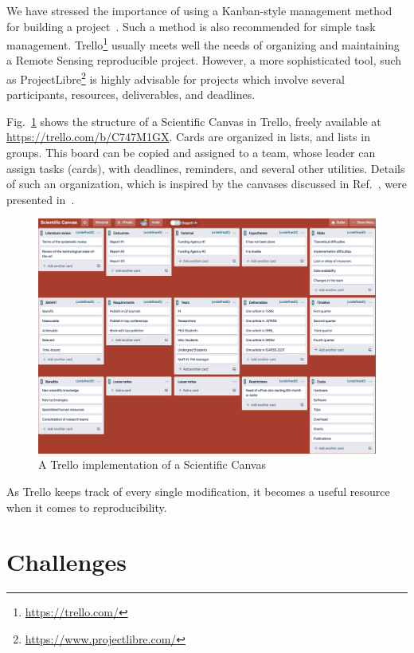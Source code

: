 \documentclass[journal,twoside]{IEEEtran}
\begin{document}
We have stressed the importance of using a Kanban-style management method for building a project~\cite{SuccessfulScientificPublishingfromtheProjecttotheAdvertising}.
Such a method is also recommended for simple task management.
Trello\footnote{\url{https://trello.com/}} usually meets well the needs of organizing and maintaining a Remote Sensing reproducible project. However, a more sophisticated tool, such as ProjectLibre\footnote{\url{https://www.projectlibre.com/}} is highly advisable for projects which involve several participants, resources, deliverables, and deadlines.

Fig.~\ref{Fig:ScientificCanvas} shows the structure of a Scientific Canvas in Trello, freely available at \url{https://trello.com/b/C747M1GX}.
Cards are organized in lists, and lists in groups.
This board can be copied and assigned to a team, whose leader can assign tasks (cards), with deadlines, reminders, and several other utilities.
Details of such an organization, which is inspired by the canvases discussed in Ref.~\cite{osterwalder2010business}, were presented in~\cite{SuccessfulScientificPublishingfromtheProjecttotheAdvertising}.

\begin{figure}[hbt]
	\centering
	\includegraphics[width=\linewidth]{ScientificCanvas}
	\caption{A Trello implementation of a Scientific Canvas}\label{Fig:ScientificCanvas}
\end{figure}

As Trello keeps track of every single modification, it becomes a useful resource when it comes to reproducibility.

\section{Challenges}\label{Sec:Challenges}
\end{document}
